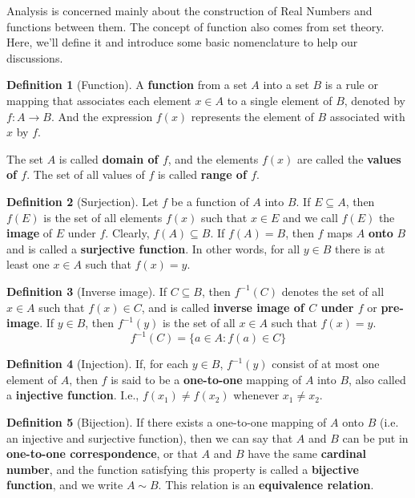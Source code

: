\documentclass[12pt,a4paper]{article}
\theoremstyle{definition}
\newtheorem{definition}{Definition}[section]
\begin{document}
Analysis is concerned mainly about the construction of Real Numbers and functions between them. The concept of function also comes from set theory. Here, we'll define it and introduce some basic nomenclature to help our discussions.

\begin{definition}[Function]
	A \textbf{function} from a set $A$ into a set $B$ is a rule or mapping that associates each element $x \in A$ to a single element of $B$, denoted by $f : A \longrightarrow B$. And the expression $f(x)$ represents the element of $B$ associated with $x$ by $f$.
	
	The set $A$ is called \textbf{domain of $f$}, and the elements $f(x)$ are called the \textbf{values of $f$}. The set of all values of $f$ is called \textbf{range of $f$}.
\end{definition}

\begin{definition}[Surjection]
	Let $f$ be a function of $A$ into $B$. If $E \subseteq A$, then $f(E)$ is the set of all elements $f(x)$ such that $x \in E$ and we call $f(E)$ the \textbf{image} of $E$ under $f$. Clearly, $f(A) \subseteq B$. If $f(A) = B$, then $f$ maps $A$ \textbf{onto} $B$ and is called a \textbf{surjective function}. In other words, for all $y \in B$ there is at least one $x \in A$ such that $f(x) = y$.
\end{definition}

\begin{definition}[Inverse image]
	If $C \subseteq B$, then $f^{-1}(C)$ denotes the set of all $x \in A$ such that $f(x) \in C$, and is called \textbf{inverse image of $C$ under $f$} or \textbf{pre-image}.
	If $y \in B$, then $f^{-1}(y)$ is the set of all $x \in A$ such that $f(x) = y$.
	\[ f^{-1}(C) = \{ a \in A : f(a) \in C \} \]
\end{definition}

\begin{definition}[Injection]
	If, for each $y \in B$, $f^{-1}(y)$ consist of at most one element of $A$, then $f$ is said to be a \textbf{one-to-one} mapping of $A$ into $B$, also called a \textbf{injective function}. I.e., $f(x_1) \neq f(x_2)$ whenever $x_1 \neq x_2$.
\end{definition}

\begin{definition}[Bijection]
	If there exists a one-to-one mapping of $A$ onto $B$ (i.e. an injective and surjective function), then we can say that $A$ and $B$ can be put in \textbf{one-to-one correspondence}, or that $A$ and $B$ have the same \textbf{cardinal number}, and the function satisfying this property is called a \textbf{bijective function}, and we write $A \sim B$. This relation is an \textbf{equivalence relation}.
\end{definition}
\end{document}
